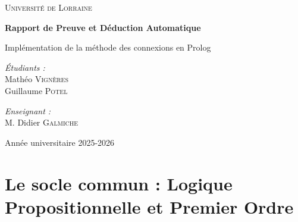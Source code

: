 \documentclass[12pt, a4paper]{article}
\begin{document}
\begin{titlepage}
    \centering
    \vspace*{2cm}
    
    {\Large \textsc{Université de Lorraine}\par}
    \vspace{1.5cm}
    
    {\huge \bfseries Rapport de Preuve et Déduction Automatique\par}
    \vspace{0.5cm}
    {\Large Implémentation de la méthode des connexions en Prolog\par}
    
    \vspace{2cm}
    
    \begin{minipage}{0.4\textwidth}
        \begin{flushleft} \large
            \emph{Étudiants :}\\
            Mathéo \textsc{Vignères}\\
            Guillaume \textsc{Potel}
        \end{flushleft}
    \end{minipage}
    \begin{minipage}{0.4\textwidth}
        \begin{flushright} \large
            \emph{Enseignant :} \\
            M. Didier \textsc{Galmiche}
        \end{flushright}
    \end{minipage}
    
    \vfill

    
    {\large Année universitaire 2025-2026\par}
\end{titlepage}

\newpage
\tableofcontents
\newpage

\section{Le socle commun : Logique Propositionnelle et Premier Ordre}
\end{document}
